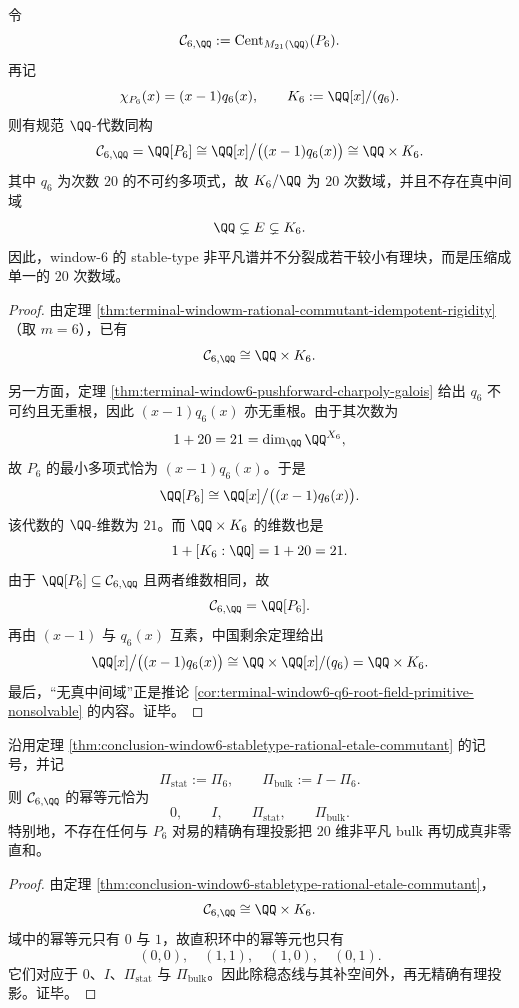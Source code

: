 \begin{theorem}\label{thm:conclusion-window6-stabletype-rational-etale-commutant}
令
\[
\mathcal C_{6,\QQ}
:=
\operatorname{Cent}_{M_{21}(\QQ)}(P_6).
\]
再记
\[
\chi_{P_6}(x)=(x-1)q_6(x),
\qquad
K_6:=\QQ[x]/(q_6).
\]
则有规范 \(\QQ\)-代数同构
\[
\mathcal C_{6,\QQ}
=
\QQ[P_6]
\cong
\QQ[x]\big/\bigl((x-1)q_6(x)\bigr)
\cong
\QQ\times K_6.
\]
其中 \(q_6\) 为次数 \(20\) 的不可约多项式，故 \(K_6/\QQ\) 为 \(20\) 次数域，并且不存在真中间域
\[
\QQ\subsetneq E\subsetneq K_6.
\]
因此，window-\(6\) 的 stable-type 非平凡谱并不分裂成若干较小有理块，而是压缩成单一的 \(20\) 次数域。
\end{theorem}
\begin{proof}
由定理 \ref{thm:terminal-windowm-rational-commutant-idempotent-rigidity}（取 \(m=6\)），已有
\[
\mathcal C_{6,\QQ}\cong \QQ\times K_6.
\]

另一方面，定理 \ref{thm:terminal-window6-pushforward-charpoly-galois} 给出 \(q_6\) 不可约且无重根，因此 \((x-1)q_6(x)\) 亦无重根。由于其次数为
\[
1+20=21=\dim_{\QQ}\QQ^{X_6},
\]
故 \(P_6\) 的最小多项式恰为 \((x-1)q_6(x)\)。于是
\[
\QQ[P_6]\cong \QQ[x]\big/\bigl((x-1)q_6(x)\bigr).
\]
该代数的 \(\QQ\)-维数为 \(21\)。而 \(\QQ\times K_6\) 的维数也是
\[
1+[K_6:\QQ]=1+20=21.
\]
由于 \(\QQ[P_6]\subseteq \mathcal C_{6,\QQ}\) 且两者维数相同，故
\[
\mathcal C_{6,\QQ}=\QQ[P_6].
\]
再由 \((x-1)\) 与 \(q_6(x)\) 互素，中国剩余定理给出
\[
\QQ[x]\big/\bigl((x-1)q_6(x)\bigr)\cong \QQ\times \QQ[x]/(q_6)=\QQ\times K_6.
\]
最后，“无真中间域”正是推论 \ref{cor:terminal-window6-q6-root-field-primitive-nonsolvable} 的内容。证毕。
\end{proof}

\begin{corollary}\label{cor:conclusion-window6-rational-bulk-indecomposable}
沿用定理 \ref{thm:conclusion-window6-stabletype-rational-etale-commutant} 的记号，并记
\[
\Pi_{\mathrm{stat}}:=\Pi_6,
\qquad
\Pi_{\mathrm{bulk}}:=I-\Pi_6.
\]
则 \(\mathcal C_{6,\QQ}\) 的幂等元恰为
\[
0,\qquad I,\qquad \Pi_{\mathrm{stat}},\qquad \Pi_{\mathrm{bulk}}.
\]
特别地，不存在任何与 \(P_6\) 对易的精确有理投影把 \(20\) 维非平凡 bulk 再切成真非零直和。
\end{corollary}
\begin{proof}
由定理 \ref{thm:conclusion-window6-stabletype-rational-etale-commutant}，
\[
\mathcal C_{6,\QQ}\cong \QQ\times K_6.
\]
域中的幂等元只有 \(0\) 与 \(1\)，故直积环中的幂等元也只有
\[
(0,0),\quad (1,1),\quad (1,0),\quad (0,1).
\]
它们对应于 \(0\)、\(I\)、\(\Pi_{\mathrm{stat}}\) 与 \(\Pi_{\mathrm{bulk}}\)。因此除稳态线与其补空间外，再无精确有理投影。证毕。
\end{proof}

